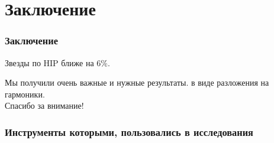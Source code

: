 \documentclass[14pt,aspectratio=43]{beamer}
\begin{document}
\section{Заключение}\label{conclusion}
\begin{frame}[<alignment>]
\frametitle{Заключение}
Звезды по HIP ближе на $6\%$.

Мы получили очень важные и нужные результаты. в виде разложения на гармоники.\\

Спасибо за внимание!
\end{frame}	



\appendix
{}
\setcounter{finalframe}{\value{framenumber}}
\begin{frame}

\frametitle{Инструменты которыми, пользовались в исследования}
\begin{figure}[H]
\begin{minipage}[h]{0.13\linewidth}
\end{minipage}
\hfill
\begin{minipage}[h]{0.13\linewidth}
\end{minipage}
\hfill
\begin{minipage}[h]{0.23\linewidth}
\end{minipage}
\hfill
\begin{minipage}[h]{0.23\linewidth}
\end{minipage}

\vfill
\begin{minipage}[h]{0.31\linewidth}
\end{minipage}
\hfill
\begin{minipage}[h]{0.31\linewidth}
\end{minipage}
\hfill
\begin{minipage}[h]{0.31\linewidth}
\end{minipage}

\vfill
\begin{minipage}[h]{0.31\linewidth}
\end{minipage}
\hfill
\begin{minipage}[h]{0.31\linewidth}
\end{minipage}
\hfill
\begin{minipage}[h]{0.31\linewidth}
\end{minipage}
\vfill


\end{figure}
\end{frame}
\end{document}
